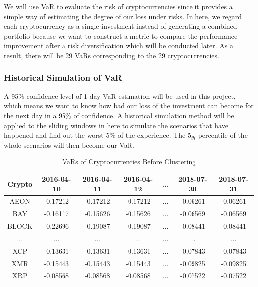 \documentclass[11pt]{article} %
\theoremstyle{plain}
\theoremstyle{definition}
\begin{document}
We will use VaR to evaluate the risk of cryptocurrencies since it provides a simple way of estimating the degree of our loss under risks. In here, we regard each cryptocurrency as a single investment instead of generating a combined portfolio because we want to construct a metric to compare the performance improvement after a risk diversification which will be conducted later. As a result, there will be 29 VaRs corresponding to the 29 cryptocurrencies.

\subsubsection{Historical Simulation of VaR}

A 95\% confidence level of 1-day VaR estimation will be used in this project, which means we want to know how bad our loss of the investment can become for the next day in a 95\% of confidence. A historical simulation method will be applied to the sliding windows in here to simulate the scenarios that have happened and find out the worst 5\% of the experience. The $5_{th}$ percentile of the whole scenarios will then become our VaR.

{
  \begin{table}[ht]
    \centering
    \small
    \begin{tabular}{|c|c c c c c c|}
        \hline
        Crypto & 2016-04-10 & 2016-04-11 & 2016-04-12 & ... & 2018-07-30 & 2018-07-31 \\ [0.5ex]
        \hline
        AEON & -0.17212 & -0.17212 & -0.17212 & ... & -0.06261 & -0.06261 \\
        \hline
        BAY & -0.16117 & -0.15626 & -0.15626 & ... & -0.06569 & -0.06569 \\
        \hline
        BLOCK & -0.22696 & -0.19087 & -0.19087 & ... & -0.08441 & -0.08441 \\
        \hline
        ... & ... & ... & ... & ... & ... & ... \\
        \hline
        XCP & -0.13631 & -0.13631 & -0.13631 & ... & -0.07843 & -0.07843 \\
        \hline
        XMR & -0.15443 & -0.15443 & -0.15443 & ... & -0.09825 & -0.09825 \\
        \hline
        XRP & -0.08568 & -0.08568 & -0.08568 & ... & -0.07522 & -0.07522 \\
        \hline
    \end{tabular}
    \caption{VaRs of Cryptocurrencies Before Clustering}
    \label{table:varcryptobefore}
  \end{table}
}
\end{document}

